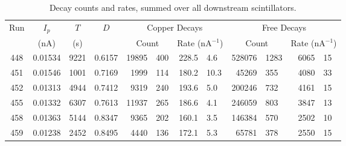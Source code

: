 \begin{table}
  \begin{center}
  \begin{tabular}{c | c | c | c | r@{\(\pm\)}l | r@{\(\pm\)}l | r@{\(\pm\)}l | r@{\(\pm\)}l  }
    \multirow{2}{*}{Run}  &  \(I_{p}\)  &  \(T\)  &  \multirow{2}{*}{\(D\)}  
         &  \multicolumn{4}{c|}{Copper Decays}   
                                          & \multicolumn{4}{c}{Free Decays}\\
                          &  (nA)       &   (s)   &
         &  \multicolumn{2}{c|}{Count}
                         &  \multicolumn{2}{c|}{ Rate (nA\(^{-1}\))}
                                          &  \multicolumn{2}{c|}{Count}
                                                            &  \multicolumn{2}{c}{Rate (nA\(^{-1}\))} \\
    \hline
    448  &  0.01534  &  9221  &  0.6157  &  19895 & 400  &  228.5 & 4.6   &  528076 & 1283  &  6065 & 15  \\
    451  &  0.01546  &  1001  &  0.7169  &   1999 & 114  &  180.2 & 10.3  &   45269 & 355   &  4080 & 33  \\
    452  &  0.01313  &  4944  &  0.7412  &   9319 & 240  &  193.6 & 5.0   &  200246 & 732   &  4161 & 15  \\
    455  &  0.01332  &  6307  &  0.7613  &  11937 & 265  &  186.6 & 4.1   &  246059 & 803   &  3847 & 13  \\
    458  &  0.01363  &  5144  &  0.8347  &   9365 & 202  &  160.1 & 3.5   &  146384 & 570   &  2502 & 10  \\
    459  &  0.01238  &  2452  &  0.8495  &   4440 & 136  &  172.1 & 5.3   &   65781 & 378   &  2550 & 15  \\
  \end{tabular}
  \end{center}
  \caption{Decay counts and rates, summed over all downstream scintillators.}
  \label{label}
\end{table}

